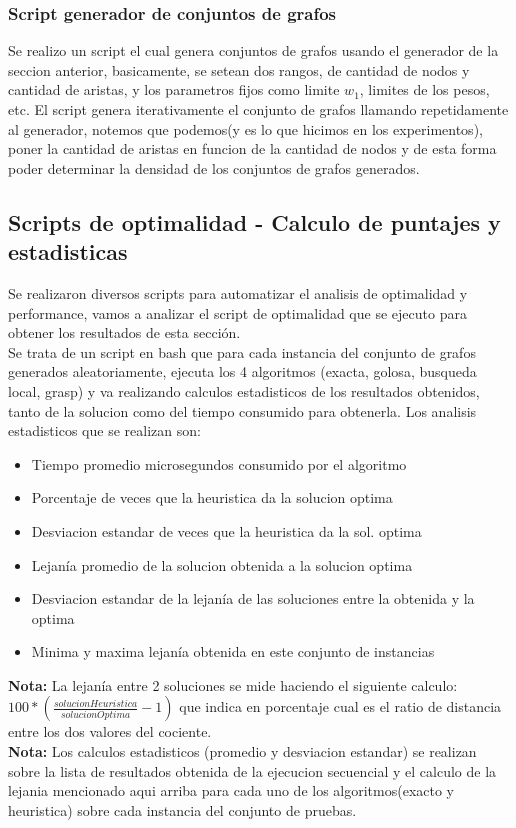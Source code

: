 \subsubsection{Script generador de conjuntos de grafos}
Se realizo un script el cual genera conjuntos de grafos usando el generador de la seccion anterior, basicamente, se setean dos rangos, de cantidad de nodos y cantidad de aristas, y los parametros fijos como limite $w_1$, limites de los pesos, etc. El script genera iterativamente el conjunto de grafos llamando repetidamente al generador, notemos que podemos(y es lo que hicimos en los experimentos), poner la cantidad de aristas en funcion de la cantidad de nodos y de esta forma poder determinar la densidad de los conjuntos de grafos generados.

\subsection{Scripts de optimalidad - Calculo de puntajes y estadisticas}
Se realizaron diversos scripts para automatizar el analisis de optimalidad y performance, vamos a analizar el script de optimalidad que se ejecuto para obtener los resultados de esta secci\'on.\\
Se trata de un script en bash que para cada instancia del conjunto de grafos generados aleatoriamente, ejecuta los 4 algoritmos (exacta, golosa, busqueda local, grasp) y va realizando calculos estadisticos de los resultados obtenidos, tanto de la solucion como del tiempo consumido para obtenerla.
Los analisis estadisticos que se realizan son:\\
\begin{itemize}
	\item Tiempo promedio microsegundos consumido por el algoritmo
	\item Porcentaje de veces que la heuristica da la solucion optima
	\item Desviacion estandar de veces que la heuristica da la sol. optima
	\item Lejan\'ia promedio de la solucion obtenida a la solucion optima
	\item Desviacion estandar de la lejan\'ia de las soluciones entre la obtenida y la optima
	\item Minima y maxima lejan\'ia obtenida en este conjunto de instancias
\end{itemize}

\textbf{Nota: }La lejan\'ia entre 2 soluciones se mide haciendo el siguiente calculo: 
$ 100 *(\frac{solucionHeuristica}{solucionOptima} - 1)  $ que indica en porcentaje cual es el ratio de distancia entre los dos valores del cociente.\\
\textbf{Nota: } Los calculos estadisticos (promedio y desviacion estandar) se realizan sobre la lista de resultados obtenida de la ejecucion secuencial y el calculo de la lejania mencionado aqui arriba para cada uno de los algoritmos(exacto y heuristica) sobre cada instancia del conjunto de pruebas.

